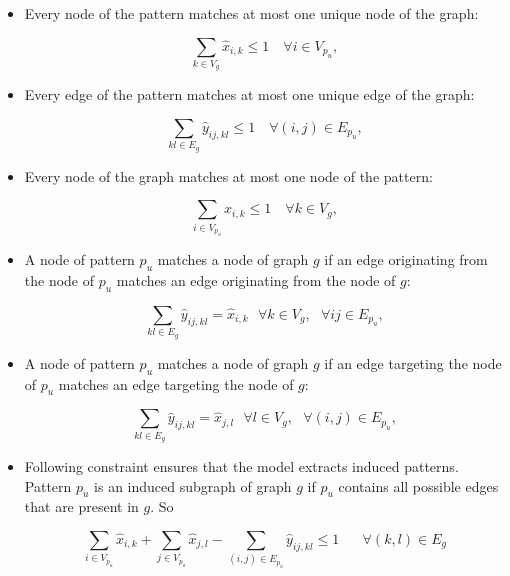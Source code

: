 \begin{itemize}
\item Every node of the pattern matches at most one unique node of the graph:

\begin{equation}
\sum_{k\in V_g}\hat{x}_{i,k} \leq 1 \quad \forall i\in V_{p_{u}},
\end{equation}

\item Every edge of the pattern matches at most one unique edge of the graph:

\begin{equation}
\sum_{kl\in E_g}\hat{y}_{ij,kl} \leq 1 \quad \forall (i,j)\in E_{p_{u}},
\end{equation}

\item Every node of the graph matches at most one node of the pattern:

\begin{equation}
\sum_{i\in V_{p_{u}}}\hat{x}_{i,k} \leq 1 \quad \forall k\in V_g,
\end{equation}

\item A node of pattern $p_u$ matches a node of graph $g$ if an edge originating from the node of $p_u$ matches an edge originating from the node of $g$:

\begin{equation}
\sum_{kl \in E_g}\hat{y}_{ij,kl} =  \hat{x}_{i,k}\textit{  }\forall k \in V_g, \textit{  }\forall ij \in E_{p_{u}},
\end{equation}

\item A node of pattern $p_u$ matches a node of graph $g$ if an edge targeting the node of $p_u$ matches an edge targeting the node of $g$:

\begin{equation}
\sum_{kl \in E_g}\hat{y}_{ij,kl} =  \hat{x}_{j,l}\textit{  }\forall l \in V_g,\textit{  }\forall (i,j) \in E_{p_{u}},
\end{equation}

\item Following constraint ensures that the model extracts induced patterns.  
Pattern $p_{u}$ is an induced subgraph of graph $g$ if $p_{u}$ contains all possible edges that are present in $g$. 
So

\begin{equation}
\sum_{i \in V_{p_{u}}}\hat{x}_{i,k} + \sum_{j \in V_{p_{u}}}\hat{x}_{j,l} - \sum_{(i,j)\in E_{p_{u}}}\hat{y}_{ij,kl} \leq 1
 \quad\textit{  }\forall (k,l)\in E_g
\end{equation}
\end{itemize}

